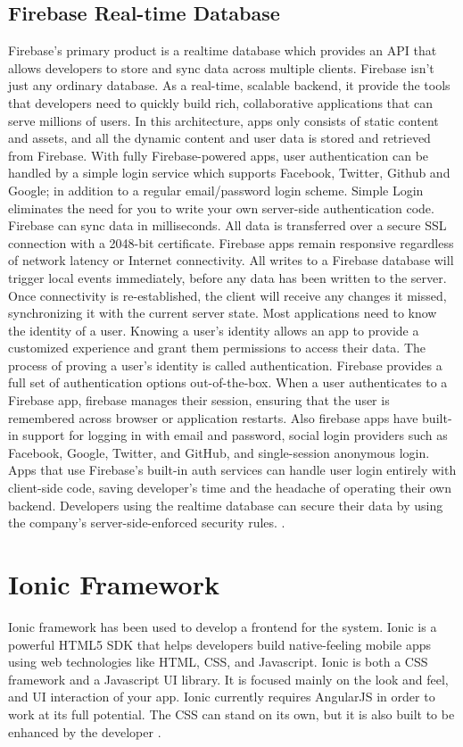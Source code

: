 \subsection{Firebase Real-time Database}
Firebase's primary product is a realtime database which provides an API that allows developers to store and sync data across multiple clients. Firebase isn’t just any ordinary database. As a real-time, scalable backend, it provide the tools that developers need to quickly build rich, collaborative applications that can serve millions of users. In this architecture, apps only consists of static content and assets, and all the dynamic content and user data is stored and retrieved from Firebase. With fully Firebase-powered apps, user authentication can be handled by a simple login service which supports Facebook, Twitter, Github and Google; in addition to a regular email/password login scheme. Simple Login eliminates the need for you to write your own server-side authentication code. Firebase can sync data in milliseconds. All data is transferred over a secure SSL connection with a 2048-bit certificate. Firebase apps remain responsive regardless of network latency or Internet connectivity. All writes to a Firebase database will trigger local events immediately, before any data has been written to the server. Once connectivity is re-established, the client will receive any changes it missed, synchronizing it with the current server state. Most applications need to know the identity of a user. Knowing a user's identity allows an app to provide a customized experience and grant them permissions to access their data. The process of proving a user's identity is called authentication. Firebase provides a full set of authentication options out-of-the-box.
When a user authenticates to a Firebase app, firebase manages their session, ensuring that the user is remembered across browser or application restarts.
Also firebase apps have built-in support for logging in with email and password, social login providers such as Facebook, Google, Twitter, and GitHub, and single-session anonymous login. Apps that use Firebase's built-in auth services can handle user login entirely with client-side code, saving developer's time and the headache of operating their own backend.
Developers using the realtime database can secure their data by using the company's server-side-enforced security rules.     
\cite{FirebaseRealtime}. 

\section{Ionic Framework }
Ionic framework has been used to develop a frontend for the system. Ionic is a powerful HTML5 SDK that helps developers build native-feeling mobile apps using web technologies like HTML, CSS, and Javascript. Ionic is both a CSS framework and a Javascript UI library. It is focused mainly on the look and feel, and UI interaction of your app. Ionic currently requires AngularJS in order to work at its full potential. The CSS can stand on its own, but it is also built to be enhanced by the developer \cite{IonicFramework}. 



